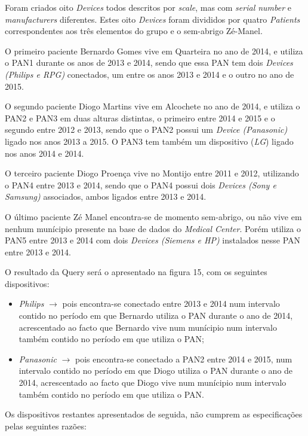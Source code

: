 \documentclass[a4paper]{article}
\begin{document}
	Foram criados oito \textit{Devices} todos descritos por \textit{scale}, mas com \textit{serial
	number} e \textit{manufacturers} diferentes. Estes oito \textit{Devices} foram divididos
	por quatro \textit{Patients} correspondentes aos três elementos do grupo e o sem-abrigo
	Zé-Manel.
	
	O primeiro paciente Bernardo Gomes vive em Quarteira no ano de 2014,
	e utiliza o PAN1 durante os anos de 2013 e 2014, sendo que essa PAN 
	tem dois \textit{Devices (Philips e RPG)} conectados, um entre os anos 2013 e
	2014 e o outro no ano de 2015.
	
	O segundo paciente Diogo Martins vive em Alcochete no ano de 2014, e
	utiliza o PAN2 e PAN3 em duas alturas distintas, o primeiro entre 2014
	e 2015 e o segundo entre 2012 e 2013, sendo que o PAN2 possui um \textit{Device 
	(Panasonic)} ligado nos anos 2013 a 2015. O PAN3 tem também um dispositivo
	(\textit{LG}) ligado nos anos 2014 e 2014.
	
	O terceiro paciente Diogo Proença vive no Montijo entre 2011 e 2012,
	utilizando o PAN4 entre 2013 e 2014, sendo que o PAN4 possui dois \textit{Devices
	(Sony e Samsung)} associados, ambos ligados entre 2013 e 2014.
	
	O último paciente Zé Manel encontra-se de momento sem-abrigo, ou não
	vive em nenhum munícipio presente na base de dados do \textit{Medical Center}.
	Porém utiliza o PAN5 entre 2013 e 2014 com dois \textit{Devices (Siemens e HP)}
	instalados nesse PAN entre 2013 e 2014.
	
	O resultado da Query será o apresentado na figura 15, com os seguintes dispositivos:
	
	\begin{itemize}
	\item \textit{Philips} $\rightarrow$ pois encontra-se conectado entre 2013 e 2014 num intervalo
	contido no período em que Bernardo utiliza o PAN durante o ano de 2014,
	acrescentado ao facto que Bernardo vive num munícipio num intervalo
	também contido no período em que utiliza o PAN;
	
	\item \textit{Panasonic} $\rightarrow$ pois encontra-se conectado a PAN2 entre 2014 e 2015, num
	intervalo contido no período em que Diogo utiliza o PAN durante o ano 
	de 2014, acrescentado ao facto que Diogo vive num munícipio num intervalo
	também contido no período em que utiliza o PAN.
	\end{itemize}
	
	Os dispositivos restantes apresentados de seguida, não cumprem as especificações pelas seguintes razões:
	
\end{document}
